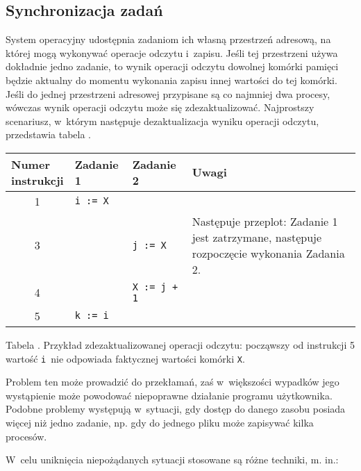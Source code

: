\documentclass[12pt]{mwart}
\newcounter{tabmain}
\newcommand{\mytabcaption}[1]{ \begin{center}\parbox[t]{11.5cm}{\normalsize{Tabela \arabic{tabmain}. #1.}}\end{center} \addtocounter{tabmain}{1} }
\begin{document}
\subsection{Synchronizacja zadań}
\label{sec:synchro}
\indent
{} \setcounter{notact}{\value{tabmain}}
  System operacyjny udostępnia zadaniom ich własną przestrzeń adresową, na której mogą wykonywać operacje odczytu i~zapisu. Jeśli tej przestrzeni używa dokładnie jedno zadanie,
  to wynik operacji odczytu dowolnej komórki pamięci będzie aktualny do momentu wykonania zapisu innej wartości do tej komórki.
  Jeśli do jednej przestrzeni adresowej przypisane są co najmniej dwa procesy, wówczas wynik operacji odczytu może się zdezaktualizować. Najprostszy scenariusz, w~którym następuje
  dezaktualizacja wyniku operacji odczytu, przedstawia tabela .
  \begin{center}
    \begin{tabular}{|c|l|l|p{4cm}|}\hline
      \multicolumn{1}{|l|}{\parbox[t]{2cm}{Numer\\instrukcji}} & Zadanie 1 & Zadanie 2 & Uwagi \\ \hline
      1 & {\tt i~:= X } & & \\ \hline
      3 &  & {\tt j~:= X } & {Następuje przeplot: Zadanie 1 jest zatrzymane, następuje rozpoczęcie wykonania Zadania 2.} \\ \hline
      4 & & {\tt X~:= j + 1 } & \\ \hline
      5 & {\tt k~:= i } & & \\ \hline
    \end{tabular}
    \mytabcaption{Przykład zdezaktualizowanej operacji odczytu: począwszy od instrukcji 5 wartość {\tt i}~nie odpowiada faktycznej wartości komórki {\tt X}}
  \end{center}
  Problem ten może prowadzić do przekłamań, zaś w~większości wypadków jego wystąpienie może powodować niepoprawne działanie programu użytkownika.
  Podobne problemy występują w~sytuacji, gdy dostęp do danego zasobu posiada więcej niż jedno zadanie, np. gdy do jednego pliku może zapisywać kilka procesów.
\par
%
\indent
  W~celu uniknięcia niepożądanych sytuacji stosowane są różne techniki, m. in.:
\end{document}

